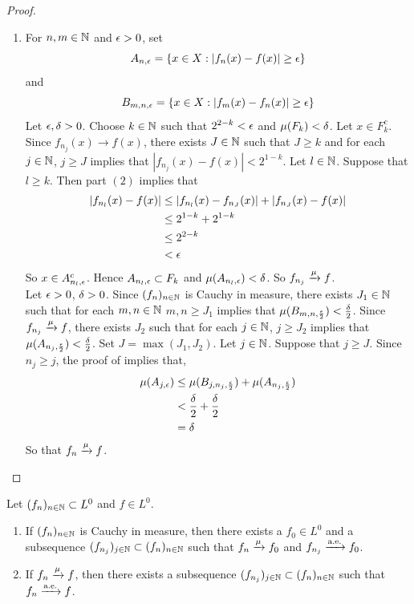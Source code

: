 \documentclass{book}
\begin{document}
\begin{proof}
\begin{enumerate}
	Define $f: X \rightarrow \C$ pointwise by $$f = \lim_{j \rightarrow \infty}f_{n_j}\chi_{F^c} $$
	Then $f \in L^0$ since $(f_{n_j}\chi_{F^c})_{j \in \N} \subset L^0$ and $f_{n_j}\chi_{F^c} \convt{p.w.} f$. Since $\mu(F) = 0$ and $\{x \in X: f_{n_j}(x) \not \rightarrow f(x)\} \subset F$, we have that $f_{n_j} \convt{a.e.} f$.\\
	\item For $n,m \in \mathbb{N}$ and $\epsilon >0$, set 
	$$A_{n, \epsilon} = \{x \in X: |f_n(x) - f(x) |\geq \epsilon \}$$ 
	and 
	$$B_{m, n, \epsilon} = \{x \in X: |f_m(x) - f_n(x)| \geq \epsilon\}$$ 
	Let $\epsilon, \delta>0$. Choose $k \in \mathbb{N}$ such that $2^{2-k} < \epsilon$ and $\mu(F_k) < \delta$. Let $x \in F_k^c$. Since $f_{n_j}(x) \rightarrow f(x)$, there exists $J \in \mathbb{N}$ such that $J \geq k$ and for each $j \in \mathbb{N}$, $j \geq J$ implies that $|f_{n_j}(x) - f(x)| < 2^{1-k}$. Let $l \in \mathbb{N}$. Suppose that $l \geq k$. Then part $(2)$ implies that
	\begin{align*}
	|f_{n_l}(x) - f(x)| 
	& \leq |f_{n_l}(x) - f_{n_J}(x)| + |f_{n_J}(x) - f(x)| \\
	&\leq 2^{1-k} + 2^{1-k}  \\
	&\leq 2^{2-k} \\
	&< \epsilon
	\end{align*}
	So $x \in A_{n_l, \epsilon}^c$. Hence $A_{n_l, \epsilon} \subset F_k$ and $\mu(A_{n_l, \epsilon}) < \delta$. So $f_{n_j} \xrightarrow{\mu} f$. \\
	Let $\epsilon >0$, $\delta > 0$. Since $(f_n)_{n \in \mathbb{N}}$ is Cauchy in measure, there exists $J_1 \in \mathbb{N}$ such that for each $m,n \in \mathbb{N}$ $m,n \geq J_1$ implies that $\mu(B_{m,n, \frac{\epsilon}{2}}) < \frac{\delta}{2}$. Since $f_{n_j} \xrightarrow{\mu} f$, there exists $J_2$ such that for each $j \in \mathbb{N}$, $j \geq J_2$ implies that $\mu(A_{n_j, \frac{\epsilon}{2}}) < \frac{\delta}{2}$. Set $J = \max(J_1, J_2)$. Let $j \in \mathbb{N}$. Suppose that $j \geq J$. Since $n_j \geq j$, the proof of  implies that, 
	\begin{align*}
	\mu(A_{j, \epsilon}) 
	&\leq \mu(B_{j, n_j, \frac{\epsilon}{2}}) + \mu(A_{n_j, \frac{\epsilon}{2}}) \\
	&< \frac{\delta}{2} + \frac{\delta}{2} \\
	&= \delta
\end{align*}		
	So that $f_n \xrightarrow{\mu} f$.
	\end{enumerate}
	\end{proof}
	
	\begin{ex}  
		Let $(f_n)_{n \in \mathbb{N}} \subset L^0$ and $f \in L^0$. 
		\begin{enumerate}
			\item If $(f_n)_{n \in \mathbb{N}}$ is Cauchy in measure, then there exists a $f_0 \in L^0$ and a subsequence $(f_{n_j})_{j \in \mathbb{N}} \subset (f_n)_{n \in \mathbb{N}}$ such that $f_n \xrightarrow{\mu} f_0$ and $f_{n_j} \xrightarrow{\text{a.e.}} f_0$.
			\item If $f_n \xrightarrow{\mu} f$, then there exists a subsequence $(f_{n_j})_{j \in \mathbb{N}} \subset (f_n)_{n \in \mathbb{N}}$ such that $f_n \xrightarrow{\text{a.e.}} f$.
		\end{enumerate}
	\end{ex}
	
\end{document}
